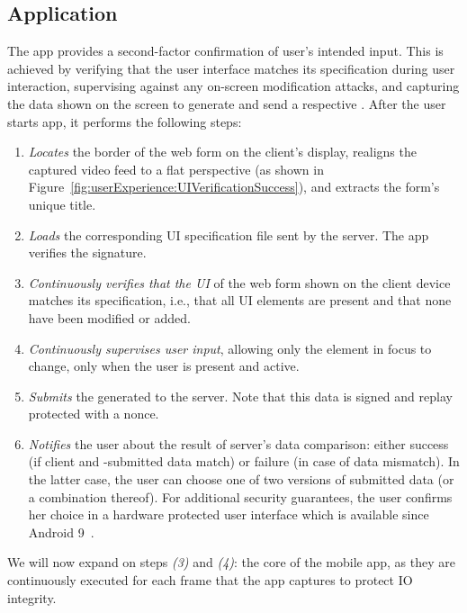\subsection{\sysname Application} 
\label{sec:systemDesign:phone}

The app provides a second-factor confirmation of user's intended input. This is achieved by verifying that the user interface matches its specification during user interaction, supervising against any on-screen modification attacks, and capturing the data shown on the screen to generate and send a respective \POI. After the user starts \sysname app, it performs the following steps:

\begin{enumerate}
    \item \emph{Locates} the border of the web form on the client's display, realigns the captured video feed to a flat perspective (as shown in Figure~\ref{fig:userExperience:UIVerificationSuccess}), and extracts the form's unique title.
    \item \emph{Loads} the corresponding UI specification file sent by the server. The app verifies the signature.
    \item \emph{Continuously verifies that the UI} of the web form shown on the client device matches its specification, i.e., that all UI elements are present and that none have been modified or added.
    \item \emph{Continuously supervises user input}, allowing only the element in focus to change, only when the user is present and active.
	\item \emph{Submits} the generated \POI to the server. Note that this data is signed and replay protected with a nonce.
    \item \emph{Notifies} the user about the result of server's data comparison: either success (if client and \md -submitted data match) or failure (in case of data mismatch). In the latter case, the user can choose one of two versions of submitted data (or a combination thereof). For additional security guarantees, the user confirms her choice in a hardware protected user interface which is available since Android 9~\cite{androidConfirmation}.
\end{enumerate}

We will now expand on steps \emph{(3)} and \emph{(4)}: the core of the \name mobile app, as they are continuously executed for each frame that the app captures to protect IO integrity.



